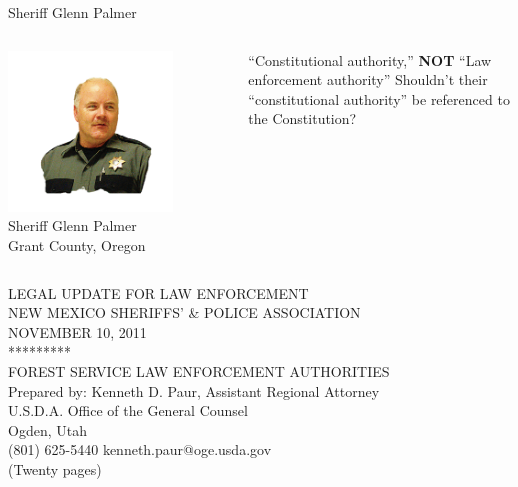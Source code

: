 \begin{frame}{Sheriff Glenn Palmer}
    \begin{columns}[onlytextwidth]
            \centering
            \includegraphics[width=0.75\textwidth]{img/glenn-palmer.png}
            \\ Sheriff Glenn Palmer
            \\ Grant County, Oregon

            { \Large
                ``Constitutional authority,'' \textbf{NOT} ``Law enforcement authority''
                \pause
                Shouldn't their ``constitutional authority'' be referenced to the Constitution?
            }
    \end{columns}
\end{frame}

\begin{frame}
    \centering
    { \Large
        LEGAL UPDATE FOR LAW ENFORCEMENT \\
        NEW MEXICO SHERIFFS' \& POLICE ASSOCIATION \\
        NOVEMBER 10, 2011 \\
        ********* \\
        FOREST SERVICE LAW ENFORCEMENT AUTHORITIES \\
        \vspace{20pt}
        Prepared by:
        Kenneth D. Paur, Assistant Regional Attorney \\
        U.S.D.A. Office of the General Counsel \\
        Ogden, Utah \\
        (801) 625-5440 kenneth.paur@oge.usda.gov \\
        (Twenty pages) \\
    }
\end{frame}

